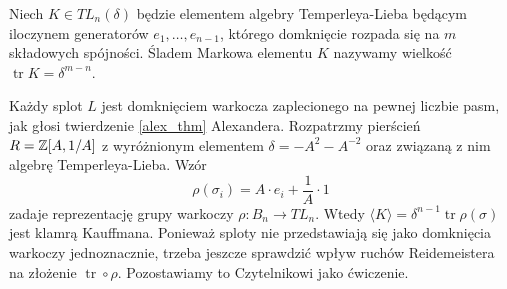 \begin{comment}
            \strand[semithick] (-3, -2) to (3, -2);
            \strand[semithick] (-3, 0) [in=down, out=right] to (-1, 1) [in=right, out=up] to (-3, 2);
            \strand[semithick] (3, 0) [in=down, out=left] to (1, 1) [in=left, out=up] to (3, 2);
            \strand[semithick] (-3, +4) to (3, +4);
            \node[darkblue] at (0, -6) {$e_3$};
    \end{knot}
    \end{tikzpicture}
    \begin{tikzpicture}[baseline=-0.65ex, scale=0.2]
        \useasboundingbox (-6, -5) rectangle (6, 4);
        \begin{knot}[clip width=5, end tolerance=1pt]
            \strand[semithick] (-3, -4) to (3, -4);
            \strand[semithick] (-3, -2) to (3, -2);
            \strand[semithick] (-3, -0) to (3, +0);
            \strand[semithick] (-3, 2) [in=down, out=right] to (-1, 3) [in=right, out=up] to (-3, 4);
            \strand[semithick] (3, 2) [in=down, out=left] to (1, 3) [in=left, out=up] to (3, 4);
            \node[darkblue] at (0, -6) {$e_4$};
    \end{knot}
    \end{tikzpicture}
\]
\caption{Diagramatyczne przedstawienie elementów bazowych algebry $TL_5(\delta)$}
\end{figure}
\end{comment}

\begin{definition}
    Niech $K \in TL_n(\delta)$ będzie elementem algebry Temperleya-Lieba będącym iloczynem generatorów $e_1, \ldots, e_{n-1}$, którego domknięcie rozpada się na $m$ składowych spójności.
    Śladem Markowa elementu $K$ nazywamy wielkość $\operatorname{tr} K = \delta^{m-n}$.
\end{definition}

Każdy splot $L$ jest domknięciem warkocza zaplecionego na pewnej liczbie pasm, jak głosi twierdzenie \ref{alex_thm} Alexandera.
Rozpatrzmy pierścień $R = \mathbb Z[A, 1/A]$ z wyróżnionym elementem $\delta = -A^2 - A^{-2}$ oraz związaną z nim algebrę Temperleya-Lieba.
Wzór
\begin{equation}
    \rho(\sigma_i) = A \cdot e_i + \frac{1}{A} \cdot 1
\end{equation}
zadaje reprezentację grupy warkoczy $\rho \colon B_n \to TL_n$.
Wtedy $\langle K \rangle = \delta^{n-1} \operatorname{tr} \rho (\sigma)$ jest klamrą Kauffmana.
Ponieważ sploty nie przedstawiają się jako domknięcia warkoczy jednoznacznie, trzeba jeszcze sprawdzić wpływ ruchów Reidemeistera na złożenie $\operatorname{tr} \circ \rho$.
Pozostawiamy to Czytelnikowi jako ćwiczenie.

